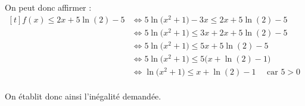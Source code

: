 \documentclass[10pt]{article}
\begin{document}
\begin{enumerate}
\begin{enumerate}
On peut donc affirmer :\quad $\begin{aligned}[t]
	f(x) \leqslant 2x + 5\ln(2) - 5
	&\iff 5\ln\big(x^2 + 1\big) - 3x \leqslant 2x + 5\ln(2) - 5\\
	&\iff 5\ln\big(x^2 + 1\big) \leqslant 3x + 2x + 5\ln(2) - 5\\
	&\iff 5\ln\big(x^2 + 1\big) \leqslant 5x + 5\ln(2) - 5\\
	&\iff 5\ln\big(x^2 + 1\big) \leqslant 5\big(x + \ln(2) - 1\big)\\
	&\iff \ln\big(x^2 + 1\big) \leqslant x + \ln(2) - 1\quad \text{ car } 5 > 0\\
\end{aligned}$

On établit donc ainsi l'inégalité demandée.
	\end{enumerate}
\end{enumerate}
\end{document}
